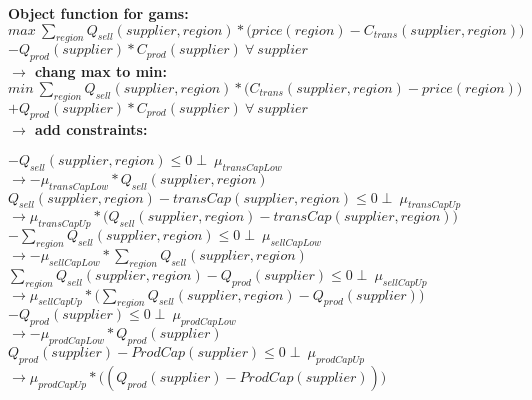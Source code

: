 \documentclass{article}
\begin{document}
\textbf{Object function for gams:}\\
\quad$ max\:\sum_{region} Q_{sell}(supplier, region) *\Big(price(region) - C_{trans}(supplier,region)\Big) $\\
\quad$- Q_{prod}(supplier)*C_{prod}(supplier)\:\forall\: supplier $\\

\textbf{$\rightarrow$ chang max to min:}\\

\quad$ min\:\sum_{region} Q_{sell}(supplier, region) *\Big(C_{trans}(supplier,region) - price(region)\Big) $\\
\quad$+ Q_{prod}(supplier)*C_{prod}(supplier)\:\forall\: supplier$ \\

\textbf{$\rightarrow$ add constraints:}

	$- Q_{sell}(supplier, region) \leq 0  \perp\: \mu_{transCapLow}$\\
	$\rightarrow	- \mu_{transCapLow} * Q_{sell}(supplier, region)$\\
	$Q_{sell}(supplier, region) - transCap(supplier, region) \leq 0  \perp\: \mu_{transCapUp}$\\
	$\rightarrow\mu_{transCapUp} *\Big( Q_{sell}(supplier, region) - transCap(supplier, region)\Big)$\\

	$ - \sum_{region} Q_{sell}(supplier, region)  \leq 0  \perp\: \mu_{sellCapLow}$\\
	$\rightarrow -\mu_{sellCapLow} * \sum_{region} Q_{sell}(supplier, region)$\\
	$\sum_{region} Q_{sell}(supplier, region) -  Q_{prod}(supplier)\leq 0  \perp\: \mu_{sellCapUp}$\\
	$\rightarrow	 \mu_{sellCapUp}*\Big(\sum_{region} Q_{sell}(supplier, region) -  Q_{prod}(supplier) \Big)$\\

	$ - Q_{prod}(supplier) \leq 0 \perp\: \mu_{prodCapLow}$\\
	$\rightarrow	- \mu_{prodCapLow} * Q_{prod}(supplier)$\\
	$Q_{prod}(supplier) - ProdCap(supplier) \leq 0 \perp\: \mu_{prodCapUp}$\\
	$\rightarrow \mu_{prodCapUp}*\Big((Q_{prod}(supplier) - ProdCap(supplier))\Big)	$\\


	
\end{document}
